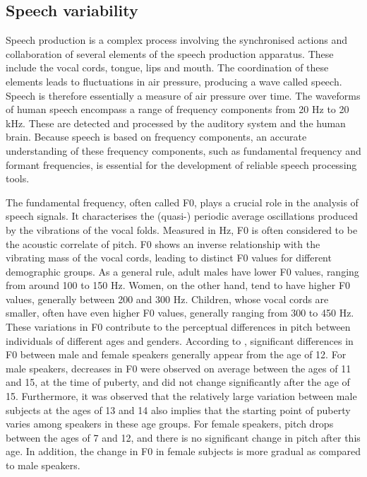 \subsection{Speech variability}%
Speech production is a complex process involving the synchronised actions and collaboration of several elements of the speech production apparatus. These include the vocal cords, tongue, lips and mouth. The coordination of these elements leads to fluctuations in air pressure, producing a wave called speech. Speech is therefore essentially a measure of air pressure over time. The waveforms of human speech encompass a range of frequency components from 20 \ac{Hz} to 20 kHz. These are detected and processed by the auditory system and the human brain. Because speech is based on frequency components, an accurate understanding of these frequency components, such as fundamental frequency and formant frequencies, is essential for the development of reliable speech processing tools.

The fundamental frequency, often called F0, plays a crucial role in the analysis of speech signals. It characterises the (quasi-) periodic average oscillations produced by the vibrations of the vocal folds. Measured in \ac{Hz}, F0 is often considered to be the acoustic correlate of pitch. F0 shows an inverse relationship with the vibrating mass of the vocal cords, leading to distinct F0 values for different demographic groups. As a general rule, adult males have lower F0 values, ranging from around 100 to 150 \ac{Hz}. Women, on the other hand, tend to have higher F0 values, generally between 200 and 300 \ac{Hz}. Children, whose vocal cords are smaller, often have even higher F0 values, generally ranging from 300 to 450 \ac{Hz}. These variations in F0 contribute to the perceptual differences in pitch between individuals of different ages and genders. 
According to \cite{Acoustic_change_children}, significant differences in F0 between male and female speakers generally appear from the age of 12. For male speakers, decreases in F0 were observed on average between the ages of 11 and 15, at the time of puberty, and did not change significantly after the age of 15. Furthermore, it was observed that the relatively large variation between male subjects at the ages of 13 and 14 also implies that the starting point of puberty varies among speakers in these age groups. For female speakers, pitch drops between the ages of 7 and 12, and there is no significant change in pitch after this age. In addition, the change in F0 in female subjects is more gradual as compared to male speakers.

